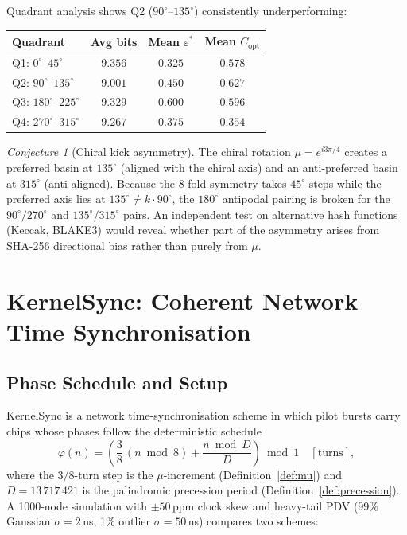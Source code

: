 \documentclass[12pt,a4paper]{article}
\theoremstyle{plain}
\theoremstyle{definition}
\theoremstyle{remark}
\newtheorem{conjecture}[theorem]{Conjecture}
\begin{document}
\noindent Quadrant analysis shows Q2 ($90^\circ$--$135^\circ$) consistently
underperforming:

\begin{center}
\renewcommand{\arraystretch}{1.2}
\begin{tabular}{@{}lccc@{}}
\toprule
Quadrant & Avg bits & Mean $\varepsilon^*$ & Mean $C_{\mathrm{opt}}$\\
\midrule
Q1: $0^\circ$--$45^\circ$    & $9.356$ & $0.325$ & $0.578$\\
Q2: $90^\circ$--$135^\circ$  & $9.001$ & $0.450$ & $0.627$\\
Q3: $180^\circ$--$225^\circ$ & $9.329$ & $0.600$ & $0.596$\\
Q4: $270^\circ$--$315^\circ$ & $9.267$ & $0.375$ & $0.354$\\
\bottomrule
\end{tabular}
\end{center}

\begin{conjecture}[Chiral kick asymmetry]\label{conj:chiral-asym}
  The chiral rotation $\mu = e^{i3\pi/4}$ creates a preferred basin at
  $135^\circ$ (aligned with the chiral axis) and an anti-preferred basin at
  $315^\circ$ (anti-aligned).  Because the $8$-fold symmetry takes $45^\circ$
  steps while the preferred axis lies at $135^\circ \ne k\cdot 90^\circ$, the
  $180^\circ$ antipodal pairing is broken for the $90^\circ/270^\circ$ and
  $135^\circ/315^\circ$ pairs.  An independent test on alternative hash
  functions (Keccak, BLAKE3) would reveal whether part of the asymmetry arises
  from SHA-256 directional bias rather than purely from $\mu$.
\end{conjecture}

\section{KernelSync: Coherent Network Time Synchronisation}
\label{sec:kernelsync}

\subsection{Phase Schedule and Setup}

KernelSync is a network time-synchronisation scheme in which pilot bursts
carry chips whose phases follow the deterministic schedule
\begin{equation}
  \varphi(n) = \left(\frac{3}{8}\,(n \bmod 8)
               + \frac{n \bmod D}{D}\right)\!\bmod 1
  \quad [\text{turns}],
  \label{eq:ks-phase}
\end{equation}
where the $3/8$-turn step is the $\mu$-increment (Definition~\ref{def:mu})
and $D = 13\,717\,421$ is the palindromic precession period
(Definition~\ref{def:precession}).  A 1000-node simulation with
$\pm 50$\,ppm clock skew and heavy-tail PDV
(99\% Gaussian $\sigma = 2$\,ns, 1\% outlier $\sigma = 50$\,ns)
compares two schemes:
\end{document}
